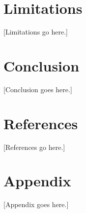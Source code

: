 \documentclass{article}
\begin{document}
\section{Limitations}
[Limitations go here.]

\section{Conclusion}
[Conclusion goes here.]

\section*{References}
[References go here.]

\appendix

\section{Appendix}
[Appendix goes here.]

\newpage

\end{document}
